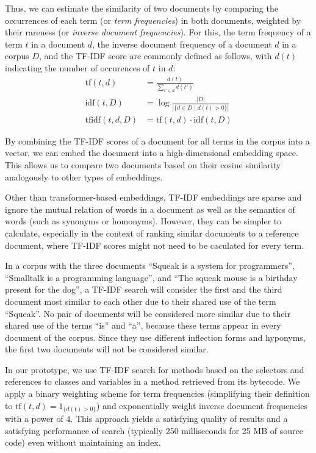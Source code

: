 Thus, we can estimate the similarity of two documents by comparing the occurrences of each term (or \emph{term frequencies}) in both documents, weighted by their rareness (or \emph{inverse document frequencies}).
For this, the term frequency of a term $t$ in a document $d$, the inverse document frequency of a document $d$ in a corpus $D$, and the TF-IDF score are commonly defined as follows, with $d(t)$ indicating the number of occurences of $t$ in $d$:
\begin{align}
	\text{tf}(t, d)	&= \frac{d(t)}{\sum_{t' \in d} d(t')} \\
	\text{idf}(t, D)	&= \log \frac{|D|}{|\{d \in D \mid d(t) > 0\}|} \\
	\text{tfidf}(t, d, D)	&= \text{tf}(t, d) \cdot \text{idf}(t, D)
\end{align}

By combining the TF-IDF scores of a document for all terms in the corpus into a vector, we can embed the document into a high-dimensional embedding space.
This allows us to compare two documents based on their cosine similarity analogously to other types of embeddings.

Other than transformer-based embeddings, TF-IDF embeddings are sparse and ignore the mutual relation of words in a document as well as the semantics of words (such as synonyms or homonyms).
However, they can be simpler to calculate, especially in the context of ranking similar documents to a reference document, where TF-IDF scores might not need to be caculated for every term.

\begin{example}
	In a corpus with the three documents ``Squeak is a system for programmers'', ``Smalltalk is a programming language'', and ``The squeak mouse is a birthday present for the dog'', a TF-IDF search will consider the first and the third document most similar to each other due to their shared use of the term ``Squeak''.
	No pair of documents will be considered more similar due to their shared use of the terms ``is'' and ``a'', because these terms appear in every document of the corpus.
	Since they use different inflection forms and hyponyms, the first two documents will not be considered similar.
\end{example}

In our prototype, we use TF-IDF search for methods based on the selectors and references to classes and variables in a method retrieved from its bytecode.
We apply a binary weighting scheme for term frequencies (simplifying their definition to $\text{tf}(t, d) = 1_{\{d(t) > 0\}}$) and exponentially weight inverse document frequencies with a power of $4$.
This approach yields a satisfying quality of results and a satisfying performance of search (typically 250 milliseconds for 25 MB of source code) even without maintaining an index.

